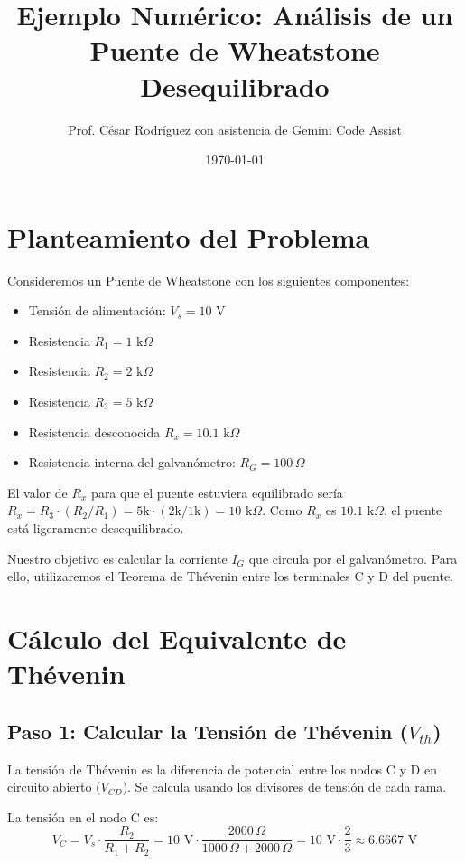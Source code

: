 \documentclass[12pt,a4paper]{article}
\title{Ejemplo Numérico: Análisis de un Puente de Wheatstone Desequilibrado}
\author{Prof. César Rodríguez con asistencia de Gemini Code Assist}
\date{\today}
\begin{document}
\maketitle

\section{Planteamiento del Problema}

Consideremos un Puente de Wheatstone con los siguientes componentes:
\begin{itemize}
    \item Tensión de alimentación: $V_s = 10 \text{ V}$
    \item Resistencia $R_1 = 1 \text{ k}\Omega$
    \item Resistencia $R_2 = 2 \text{ k}\Omega$
    \item Resistencia $R_3 = 5 \text{ k}\Omega$
    \item Resistencia desconocida $R_x = 10.1 \text{ k}\Omega$
    \item Resistencia interna del galvanómetro: $R_G = 100 \, \Omega$
\end{itemize}

El valor de $R_x$ para que el puente estuviera equilibrado sería $R_x = R_3 \cdot (R_2/R_1) = 5 \text{k} \cdot (2\text{k}/1\text{k}) = 10 \text{ k}\Omega$. Como $R_x$ es $10.1 \text{ k}\Omega$, el puente está ligeramente desequilibrado.

Nuestro objetivo es calcular la corriente $I_G$ que circula por el galvanómetro. Para ello, utilizaremos el Teorema de Thévenin entre los terminales C y D del puente.

\section{Cálculo del Equivalente de Thévenin}

\subsection{Paso 1: Calcular la Tensión de Thévenin ($V_{th}$)}
La tensión de Thévenin es la diferencia de potencial entre los nodos C y D en circuito abierto ($V_{CD}$). Se calcula usando los divisores de tensión de cada rama.

La tensión en el nodo C es:
\[
V_C = V_s \cdot \frac{R_2}{R_1 + R_2} = 10 \text{ V} \cdot \frac{2000 \, \Omega}{1000 \, \Omega + 2000 \, \Omega} = 10 \text{ V} \cdot \frac{2}{3} \approx 6.6667 \text{ V}
\]
\end{document}
